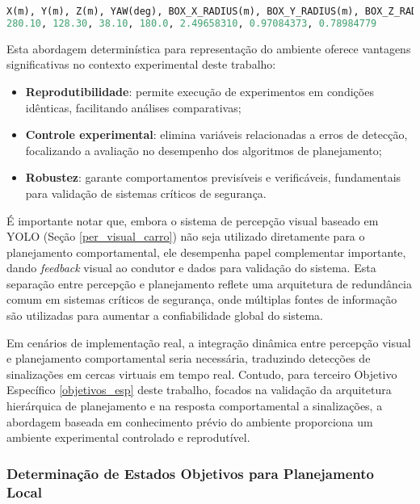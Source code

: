 \begin{lstlisting}[language=Python, caption=Exemplo de arquivo de parâmetros de veículo estacionado., label=lst:parked_vehicle_params]
X(m), Y(m), Z(m), YAW(deg), BOX_X_RADIUS(m), BOX_Y_RADIUS(m), BOX_Z_RADIUS(m)
280.10, 128.30, 38.10, 180.0, 2.49658310, 0.97084373, 0.78984779
\end{lstlisting}

Esta abordagem determinística para representação do ambiente oferece vantagens significativas no contexto experimental deste trabalho:

\begin{itemize}
    \item \textbf{Reprodutibilidade}: permite execução de experimentos em condições idênticas, facilitando análises comparativas;
    \item \textbf{Controle experimental}: elimina variáveis relacionadas a erros de detecção, focalizando a avaliação no desempenho dos algoritmos de planejamento;
    \item \textbf{Robustez}: garante comportamentos previsíveis e verificáveis, fundamentais para validação de sistemas críticos de segurança.
\end{itemize}

É importante notar que, embora o sistema de percepção visual baseado em YOLO (Seção \ref{per_visual_carro}) não seja utilizado diretamente para o planejamento comportamental, ele desempenha papel complementar importante, dando \textit{feedback} visual ao condutor e dados para validação do sistema. Esta separação entre percepção e planejamento reflete uma arquitetura de redundância comum em sistemas críticos de segurança, onde múltiplas fontes de informação são utilizadas para aumentar a confiabilidade global do sistema.

Em cenários de implementação real, a integração dinâmica entre percepção visual e planejamento comportamental seria necessária, traduzindo detecções de sinalizações em cercas virtuais em tempo real. Contudo, para terceiro Objetivo Específico \ref{objetivos_esp} deste trabalho, focados na validação da arquitetura hierárquica de planejamento e na resposta comportamental a sinalizações, a abordagem baseada em conhecimento prévio do ambiente proporciona um ambiente experimental controlado e reprodutível.

\subsubsection{Determinação de Estados Objetivos para Planejamento Local}

